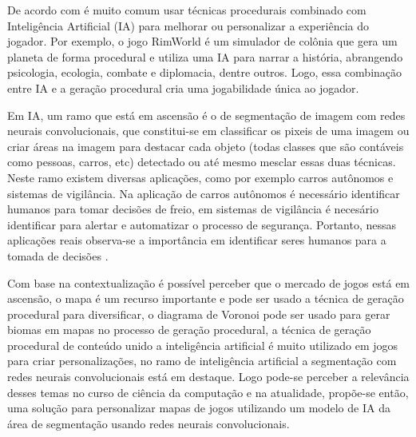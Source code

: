 De acordo com \space{} é muito comum usar técnicas procedurais combinado com Inteligência Artificial (IA) para melhorar ou personalizar a experiência do jogador. Por exemplo, o jogo RimWorld é um simulador de colônia que gera um planeta de forma procedural e utiliza uma IA para narrar a história, abrangendo psicologia, ecologia, combate e diplomacia, dentre outros. Logo, essa combinação entre IA e a geração procedural cria uma jogabilidade única ao jogador.


Em IA, um ramo que está em ascensão é o de segmentação de imagem com redes neurais convolucionais, que constitui-se em classificar os pixeis de uma imagem ou criar áreas na imagem para destacar cada objeto (todas classes que são contáveis como pessoas, carros, etc) detectado ou até mesmo mesclar essas duas técnicas. Neste ramo existem diversas aplicações, como por exemplo carros autônomos e sistemas de vigilância.
Na aplicação de carros autônomos é necessário identificar humanos para tomar decisões de freio, em sistemas de vigilância é necesário identificar para alertar e automatizar o processo de segurança. Portanto, nessas aplicações reais observa-se a importância em identificar seres humanos para a tomada de decisões \space\cite{dp_semantic_segmantation}.



Com base na contextualização é possível perceber que o mercado de jogos está em ascensão, o mapa é um recurso importante e pode ser usado a técnica de geração procedural para diversificar, o diagrama de Voronoi pode ser usado para gerar biomas em mapas no processo de geração procedural, a técnica de geração procedural de conteúdo unido a inteligência artificial é muito utilizado em jogos para criar personalizações, no ramo de inteligência artificial a segmentação com redes neurais convolucionais está em destaque. Logo pode-se perceber a relevância desses temas no curso de ciência da computação e na atualidade, propõe-se então, uma solução para personalizar mapas de jogos utilizando um modelo de IA da área de segmentação usando redes neurais convolucionais.

